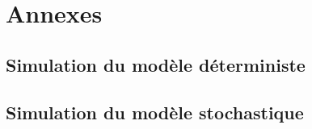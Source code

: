 \chapter{Annexes}
\begin{appendix}
\section{Simulation du modèle déterministe}
\label{simu_det}

\section{Simulation du modèle stochastique}

\end{appendix}
